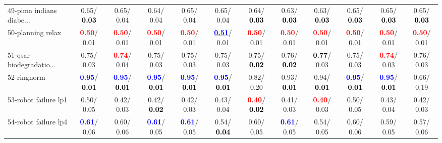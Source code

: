 \begin{table}[h]
\begin{center}
{\begin{tabular}{lc|c|c|c|c|c|c|c|c|c|c}
49-pima indians diabe... &   0.65/\textcolor{black}{\textbf{  0.03}} &   0.65/  0.04 &   0.64/  0.04 &   0.65/  0.04 &   0.65/  0.04 &   0.64/\textcolor{black}{\textbf{  0.03}} &   0.63/\textcolor{black}{\textbf{  0.03}} &   0.63/\textcolor{black}{\textbf{  0.03}} &   0.65/\textcolor{black}{\textbf{  0.03}} &   0.65/\textcolor{black}{\textbf{  0.03}} &   0.65/\textcolor{black}{\textbf{  0.03}} \\
50-planning relax & \textcolor{red}{\textbf{  0.50}}/  0.01 & \textcolor{red}{\textbf{  0.50}}/  0.01 & \textcolor{red}{\textbf{  0.50}}/  0.01 & \textcolor{red}{\textbf{  0.50}}/  0.01 & \underline{\textcolor{blue}{\textbf{  0.51}}}/  0.01 & \textcolor{red}{\textbf{  0.50}}/  0.01 & \textcolor{red}{\textbf{  0.50}}/  0.01 & \textcolor{red}{\textbf{  0.50}}/  0.01 & \textcolor{red}{\textbf{  0.50}}/  0.01 & \textcolor{red}{\textbf{  0.50}}/  0.01 & \textcolor{red}{\textbf{  0.50}}/  0.01 \\
51-qsar biodegradatio... &   0.75/  0.03 & \textcolor{red}{\textbf{  0.74}}/  0.04 &   0.75/  0.03 &   0.75/  0.03 &   0.75/  0.03 &   0.75/\textcolor{black}{\textbf{  0.02}} &   0.76/\textcolor{black}{\textbf{  0.02}} & \textcolor{black}{\textbf{  0.77}}/  0.03 &   0.75/  0.03 & \textcolor{red}{\textbf{  0.74}}/  0.03 &   0.76/  0.03 \\
52-ringnorm & \textcolor{blue}{\textbf{  0.95}}/\textcolor{black}{\textbf{  0.01}} & \textcolor{blue}{\textbf{  0.95}}/\textcolor{black}{\textbf{  0.01}} & \textcolor{blue}{\textbf{  0.95}}/\textcolor{black}{\textbf{  0.01}} & \textcolor{blue}{\textbf{  0.95}}/\textcolor{black}{\textbf{  0.01}} & \textcolor{blue}{\textbf{  0.95}}/\textcolor{black}{\textbf{  0.01}} &   0.82/  0.20 &   0.93/\textcolor{black}{\textbf{  0.01}} &   0.94/\textcolor{black}{\textbf{  0.01}} & \textcolor{blue}{\textbf{  0.95}}/\textcolor{black}{\textbf{  0.01}} & \textcolor{blue}{\textbf{  0.95}}/\textcolor{black}{\textbf{  0.01}} &   0.66/  0.19 \\
53-robot failure lp1 &   0.50/  0.05 &   0.42/  0.03 &   0.42/\textcolor{black}{\textbf{  0.02}} &   0.42/  0.03 &   0.43/  0.04 & \textcolor{red}{\textbf{  0.40}}/\textcolor{black}{\textbf{  0.02}} &   0.41/  0.03 & \textcolor{red}{\textbf{  0.40}}/  0.03 &   0.50/  0.05 &   0.43/  0.04 &   0.42/  0.03 \\ \hline
54-robot failure lp4 & \textcolor{blue}{\textbf{  0.61}}/  0.06 &   0.60/  0.06 & \textcolor{blue}{\textbf{  0.61}}/  0.05 & \textcolor{blue}{\textbf{  0.61}}/  0.05 &   0.54/\textcolor{black}{\textbf{  0.04}} &   0.60/  0.05 & \textcolor{blue}{\textbf{  0.61}}/  0.05 &   0.54/  0.05 &   0.60/  0.06 &   0.59/  0.05 &   0.57/  0.06 \\

\end{tabular}}
\end{center}
\end{table}
